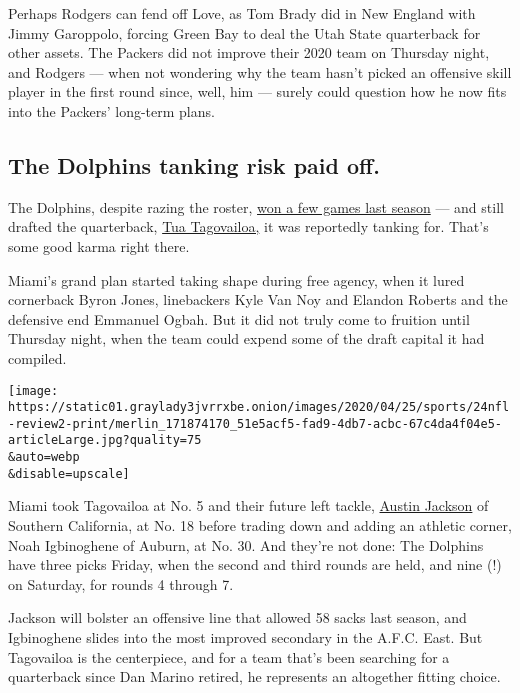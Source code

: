 Perhaps Rodgers can fend off Love, as Tom Brady did in New England with
Jimmy Garoppolo, forcing Green Bay to deal the Utah State quarterback
for other assets. The Packers did not improve their 2020 team on
Thursday night, and Rodgers --- when not wondering why the team hasn't
picked an offensive skill player in the first round since, well, him ---
surely could question how he now fits into the Packers' long-term plans.

\hypertarget{the-dolphins-tanking-risk-paid-off}{%
\subsection{The Dolphins tanking risk paid
off.}\label{the-dolphins-tanking-risk-paid-off}}

The Dolphins, despite razing the roster,
\href{https://www.nytimes3xbfgragh.onion/2019/09/19/sports/football/brian-flores-dolphins.html}{won
a few games last season} --- and still drafted the quarterback,
\href{https://www.nytimes3xbfgragh.onion/article/tua-tagovailoa.html}{Tua
Tagovailoa,} it was reportedly tanking for. That's some good karma right
there.

Miami's grand plan started taking shape during free agency, when it
lured cornerback Byron Jones, linebackers Kyle Van Noy and Elandon
Roberts and the defensive end Emmanuel Ogbah. But it did not truly come
to fruition until Thursday night, when the team could expend some of the
draft capital it had compiled.

\texttt{[image: https://static01.graylady3jvrrxbe.onion/images/2020/04/25/sports/24nfl-review2-print/merlin\_171874170\_51e5acf5-fad9-4db7-acbc-67c4da4f04e5-articleLarge.jpg?quality=75\\\&auto=webp\\\&disable=upscale]}

Miami took Tagovailoa at No. 5 and their future left tackle,
\href{https://www.nytimes3xbfgragh.onion/article/austin-jackson.html}{Austin
Jackson} of Southern California, at No. 18 before trading down and
adding an athletic corner, Noah Igbinoghene of Auburn, at No. 30. And
they're not done: The Dolphins have three picks Friday, when the second
and third rounds are held, and nine (!) on Saturday, for rounds 4
through 7.

Jackson will bolster an offensive line that allowed 58 sacks last
season, and Igbinoghene slides into the most improved secondary in the
A.F.C. East. But Tagovailoa is the centerpiece, and for a team that's
been searching for a quarterback since Dan Marino retired, he represents
an altogether fitting choice.

